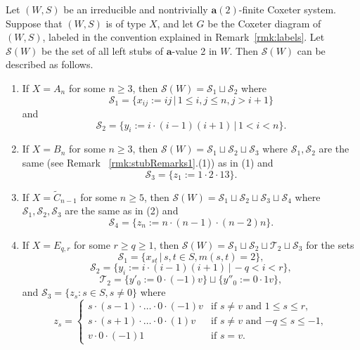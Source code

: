 \documentclass[ALCO,Unicode,published]{cedram}
\newcommand{\cals}{\mathcal{S}}
\newcommand{\la}{\mathbf{a}}
\newcommand{\sx}{\mathcal{S}(W)}
\begin{document}
\begin{thm}
    \label{thm:stubDescription}
    Let $(W,S)$ be an irreducible and nontrivially $\la(2)$-finite Coxeter system. Suppose that $(W,S)$ is of type
    $X$, and let $G$ be the Coxeter diagram of $(W,S)$, labeled in the convention explained in Remark~\ref{rmk:labels}.
    Let $\sx$ be the set of all left stubs of $\la$-value 2 in $W$.  Then $\sx$ can be described as follows. 
    \begin{enumerate}
        \item If $X=A_n$ for some $n\ge 3$, then $\sx=\mathcal{S}_1\sqcup\mathcal{S}_2$ where 
            \[
            \mathcal{S}_1=\{x_{ij}:=ij\,\vert\, 1\le i,j\le n,j>i+1\}\]
            and
            \[
                \mathcal{S}_2=\{y_i:=i\cdot
                (i-1)(i+1)\,\vert\, 1< i<n\}.
            \]
        \item If $X=B_n$ for some $n\ge 3$, then $\sx=\mathcal{S}_1\sqcup\mathcal{S}_2\sqcup \cals_3$ where
            $\mathcal{S}_1,\mathcal{S}_2$ are the same \textup{(}see Remark
           ~\ref{rmk:stubRemarks1}.\textup{(}1\textup{)}\textup{)} as in \textup{(}1\textup{)}
            and 
            \[
                \cals_3=\{z_1:=1\cdot 2\cdot 13\}.
            \] 
        \item If $X=\tilde C_{n-1}$ for some $n\ge 5$, then $\sx =\cals_1\sqcup \cals_2\sqcup
             \cals_3\sqcup\cals_4$ where $\cals_1,\cals_2,\cals_3$ are the same as in
             \textup{(}2\textup{)} and 
            \[
                \cals_4=\{z_n:=n\cdot (n-1)\cdot (n-2)n\}.
            \]
        \item If $X=E_{q,r}$ for some $r\ge q\ge 1$, then $\sx=\cals_1\sqcup\cals_2\sqcup
             \mathcal{T}_2\sqcup\cals_3$ for the sets 
            \[
            \cals_1=\{x_{st}\,\vert\,s,t\in S, m(s,t)=2\},\]
            \[
                \cals_2=\{y_{i}:= i\cdot (i-1)(i+1)\,\vert\, -q< i<r\},
            \]
            \[
                \mathcal{T}_2=\{y'_0:=0\cdot (-1)v\}\sqcup\{y''_0:=0\cdot 1v\},
            \]
            and $\cals_3=\{z_s: s\in S, s\neq 0\}$ where 
            \[
                z_s= 
                \begin{cases}
                    s\cdot (s-1)\cdot \ldots \cdot 0\cdot (-1)v &\text{if $s\neq v$ and $1\le s\le
                    r$},\\
                    s\cdot (s+1)\cdot \ldots \cdot 0\cdot (1)v & \text{if $s\neq v$ and $-q\le s\le -1$},\\
                    v\cdot 0 \cdot (-1)1&\text{if $s=v$}.

\end{cases}\]
\end{enumerate}
\end{thm}
\end{document}
